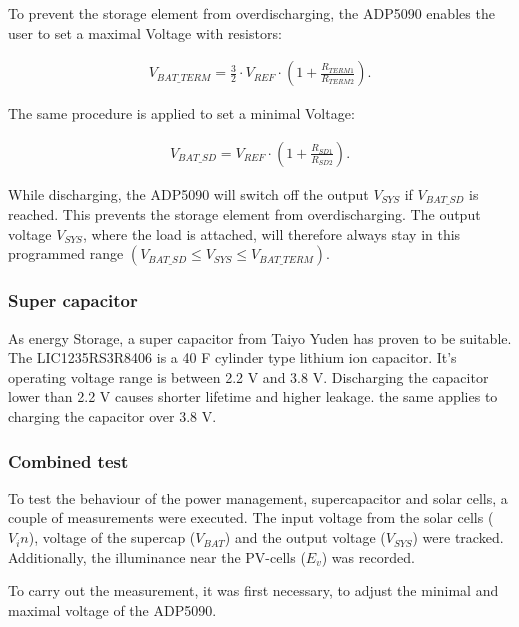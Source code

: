 To prevent the storage element from overdischarging, the ADP5090 enables the user to set a maximal Voltage with resistors:

\begin{align}
	V_{BAT\_TERM} = \frac{3}{2}\cdot V_{REF}\cdot\left(1+\frac{R_{TERM1}}{R_{TERM2}} \right).\label{development:v_bat_term} 
\end{align} 

The same procedure is applied to set a minimal Voltage:

\begin{align}
	V_{BAT\_SD}=V_{REF}\cdot \left(1+\frac{R_{SD1}}{R_{SD2}} \right).\label{development:v_bat_sd} 
\end{align}  

While discharging, the ADP5090 will switch off the output $V_{SYS}$ if $V_{BAT\_SD}$ is reached. This prevents the storage element from overdischarging.
The output voltage $V_{SYS}$, where the load is attached, will therefore always stay in this programmed range $(V_{BAT\_SD}\le V_{SYS}\le V_{BAT\_TERM})$.
\cite{adp}

\subsubsection{Super capacitor}
As energy Storage, a super capacitor from Taiyo Yuden has proven to be suitable.
The LIC1235RS3R8406 is a 40 F cylinder type lithium ion capacitor.
It's operating voltage range is between 2.2 V and 3.8 V.
Discharging the capacitor lower than 2.2 V causes shorter lifetime and higher leakage.
the same applies to charging the capacitor over 3.8 V.
\cites{yuden}

\subsubsection{Combined test}
To test the behaviour of the power management, supercapacitor and solar cells, a couple of measurements were executed.
The input voltage from the solar cells ($V_in$), voltage of the supercap ($V_{BAT}$) and the output voltage ($V_{SYS}$) were tracked. Additionally, the illuminance near the PV-cells ($E_v$) was recorded.

To carry out the measurement, it was first necessary, to adjust the minimal and maximal voltage of the ADP5090.

